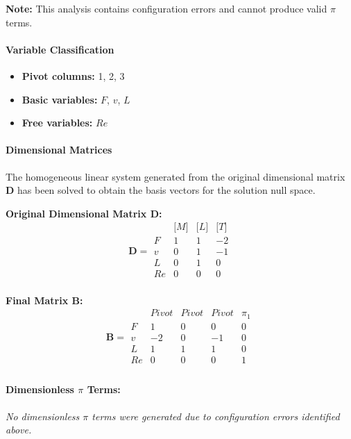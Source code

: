 \textbf{Note:} This analysis contains configuration errors and cannot produce valid $\pi$ terms.


\paragraph{Variable Classification}
\begin{itemize}
\item \textbf{Pivot columns:} 1, 2, 3
\item \textbf{Basic variables:} $F$, $v$, $L$
\item \textbf{Free variables:} $Re$
\end{itemize}

                \paragraph{Dimensional Matrices}
                The homogeneous linear system generated from the original dimensional matrix $\mathbf{D}$ has been solved to obtain the basis vectors for the solution null space.

                \textbf{Original Dimensional Matrix $\mathbf{D}$:}
                \[\mathbf{D} = \begin{array}{r|rrr}
                & \text{[}M\text{]} & \text{[}L\text{]} & \text{[}T\text{]} \\
                \hline
                F & 1 & 1 & -2 \\
v & 0 & 1 & -1 \\
L & 0 & 1 & 0 \\
Re & 0 & 0 & 0 \\

                \end{array}\]


        \textbf{Final Matrix $\mathbf{B}$:}
        \[\mathbf{B} = \begin{array}{r|rrrr}
        & Pivot & Pivot & Pivot & \pi_{1} \\
        \hline
        F & 1 & 0 & 0 & 0 \\
v & -2 & 0 & -1 & 0 \\
L & 1 & 1 & 1 & 0 \\
Re & 0 & 0 & 0 & 1 \\

        \end{array}\]

        \paragraph{Dimensionless $\pi$ Terms: }
        \textit{No dimensionless $\pi$ terms were generated due to configuration errors identified above.}


